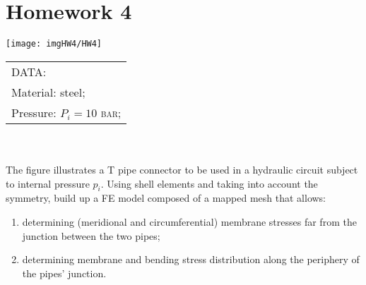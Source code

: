 \chapter{Homework 4}
\begin{minipage}{.70\textwidth}
\centering
\texttt{[image: imgHW4/HW4]}
\end{minipage}
\begin{minipage}{.70\textwidth}
\begin{tabular}{l}
        DATA:\\
        Material: steel;\\
        Pressure: $P_{i}= 10$ \textsc{bar};
\end{tabular}
\end{minipage}\\\\
The figure illustrates a T pipe connector to be used in a hydraulic circuit subject to internal pressure $p_{i}$. Using shell elements and taking into account the symmetry, build up a FE model composed of a mapped mesh that allows:
\begin{enumerate}
\item determining (meridional and circumferential) membrane stresses far from the junction between the two pipes;
\item determining membrane and bending stress distribution along the periphery of the pipes' junction.
\end{enumerate}
